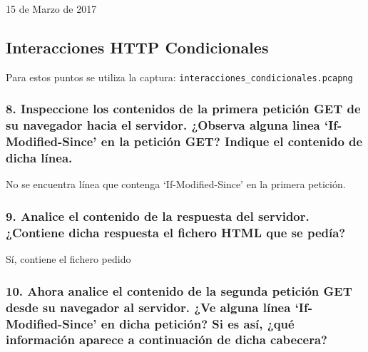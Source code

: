 \documentclass[11pt]{article}
\begin{document}
15 de Marzo de 2017

    \hypertarget{interacciones-http-condicionales}{%
\subsection{Interacciones HTTP
Condicionales}\label{interacciones-http-condicionales}}

    Para estos puntos se utiliza la captura:
\texttt{interacciones\_condicionales.pcapng}

    \hypertarget{inspeccione-los-contenidos-de-la-primera-peticiuxf3n-get-de-su-navegador-hacia-el-servidor.-observa-alguna-linea-if-modified-since-en-la-peticiuxf3n-get-indique-el-contenido-de-dicha-luxednea.}{%
\subsubsection{8. Inspeccione los contenidos de la primera petición GET
de su navegador hacia el servidor. ¿Observa alguna linea
`If-Modified-Since' en la petición GET? Indique el contenido de dicha
línea.}\label{inspeccione-los-contenidos-de-la-primera-peticiuxf3n-get-de-su-navegador-hacia-el-servidor.-observa-alguna-linea-if-modified-since-en-la-peticiuxf3n-get-indique-el-contenido-de-dicha-luxednea.}}

No se encuentra línea que contenga `If-Modified-Since' en la primera
petición.

\hypertarget{analice-el-contenido-de-la-respuesta-del-servidor.-contiene-dicha-respuesta-el-fichero-html-que-se-peduxeda}{%
\subsubsection{9. Analice el contenido de la respuesta del servidor.
¿Contiene dicha respuesta el fichero HTML que se
pedía?}\label{analice-el-contenido-de-la-respuesta-del-servidor.-contiene-dicha-respuesta-el-fichero-html-que-se-peduxeda}}

Sí, contiene el fichero pedido

\hypertarget{ahora-analice-el-contenido-de-la-segunda-peticiuxf3n-get-desde-su-navegador-al-servidor.-ve-alguna-luxednea-if-modified-since-en-dicha-peticiuxf3n-si-es-asuxed-quuxe9-informaciuxf3n-aparece-a-continuaciuxf3n-de-dicha-cabecera}{%
\subsubsection{10. Ahora analice el contenido de la segunda petición GET
desde su navegador al servidor. ¿Ve alguna línea `If-Modified-Since' en
dicha petición? Si es así, ¿qué información aparece a continuación de
dicha
cabecera?}\label{ahora-analice-el-contenido-de-la-segunda-peticiuxf3n-get-desde-su-navegador-al-servidor.-ve-alguna-luxednea-if-modified-since-en-dicha-peticiuxf3n-si-es-asuxed-quuxe9-informaciuxf3n-aparece-a-continuaciuxf3n-de-dicha-cabecera}}
\end{document}
